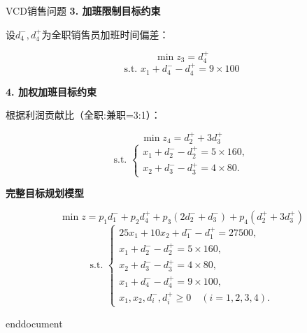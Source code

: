 \begin{exbox}{VCD销售问题}{}
        \noindent \textbf{3. 加班限制目标约束}
        
        设$d_4^-, d_4^+$为全职销售员加班时间偏差：
        
        \[
        \min z_3 = d_4^+
        \]
        \[
        \text{s.t. } x_1 + d_4^- - d_4^+ = 9 \times 100
        \]
        
        \noindent \textbf{4. 加权加班目标约束}
        
        根据利润贡献比（全职:兼职=3:1）：
        
        \[
        \min z_4 = d_2^+ + 3d_3^+
        \]
        \[
        \text{s.t. }
        \begin{cases}
        x_1 + d_2^- - d_2^+ = 5 \times 160, \\
        x_2 + d_3^- - d_3^+ = 4 \times 80.
        \end{cases}
        \]
        
        \noindent \textbf{完整目标规划模型}
        
        \[
        \min z = p_1 d_1^- + p_2 d_4^+ + p_3 (2d_2^- + d_3^-) + p_4 (d_2^+ + 3d_3^+)
        \]
        \[
        \text{s.t. }
        \begin{cases}
        25x_1 + 10x_2 + d_1^- - d_1^+ = 27500, \\
        x_1 + d_2^- - d_2^+ = 5 \times 160, \\
        x_2 + d_3^- - d_3^+ = 4 \times 80, \\
        x_1 + d_4^- - d_4^+ = 9 \times 100, \\
        x_1, x_2, d_i^-, d_i^+ \geq 0 \quad (i=1,2,3,4).
        \end{cases}
        \]
    \end{exbox}
    
\ifx\allfiles\undefined
	
	
	end{document}
	\else
	\fi